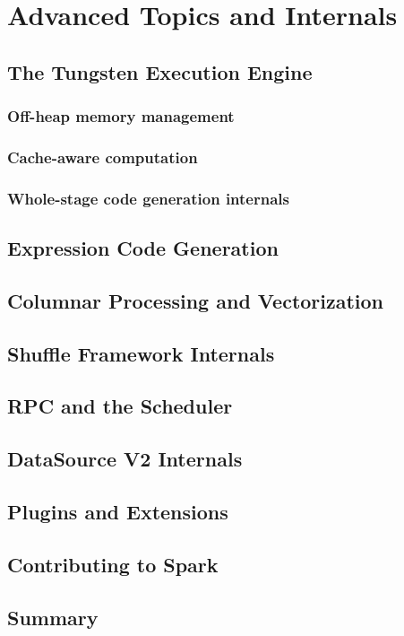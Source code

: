 \chapter{Advanced Topics and Internals}
\label{ch:internals}

\tbd


\section{The Tungsten Execution Engine}
\label{sec:int-tungsten}

\subsection{Off-heap memory management}
\tbd

\subsection{Cache-aware computation}
\tbd

\subsection{Whole-stage code generation internals}
\tbd

\section{Expression Code Generation}
\label{sec:int-codegen}
\tbd

\section{Columnar Processing and Vectorization}
\label{sec:int-vectorization}
\tbd

\section{Shuffle Framework Internals}
\label{sec:int-shuffle}
\tbd

\section{RPC and the Scheduler}
\label{sec:int-scheduler}
\tbd

\section{DataSource V2 Internals}
\label{sec:int-dsv2}
\tbd

\section{Plugins and Extensions}
\label{sec:int-plugins}
\tbd

\section{Contributing to Spark}
\label{sec:int-contributing}
\tbd

\section{Summary}
\tbd
